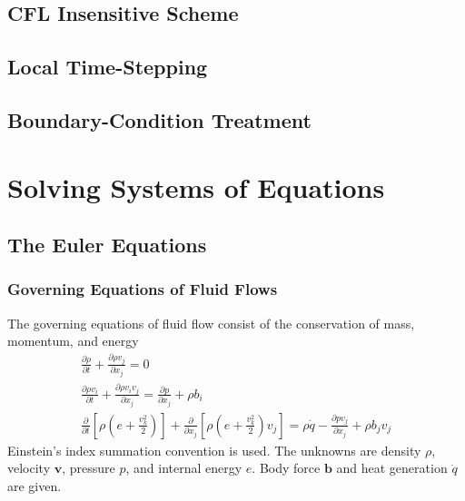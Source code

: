\documentclass{turgon}
\begin{document}
\section{CFL Insensitive Scheme}
\label{s:cese:ctau}

\section{Local Time-Stepping}
\label{s:cese:lts}

\section{Boundary-Condition Treatment}
\label{s:cese:bc}

\chapter{Solving Systems of Equations}
\label{c:syseq}

\section{The Euler Equations}
\label{s:syseq:euler}

\subsection{Governing Equations of Fluid Flows}

The governing equations of fluid flow consist of the conservation of mass,
momentum, and energy
%
\begin{gather}
  \frac{\partial\rho}{\partial t} + \frac{\partial\rho v_j}{\partial x_j}
  = 0
  \label{e:euler:mass}
  \\
  \frac{\partial\rho v_i}{\partial t}
  + \frac{\partial\rho v_iv_j}{\partial x_j}
  = \frac{\partial p}{\partial x_j} + \rho b_i
  \label{e:euler:momentum}
  \\
  \frac{\partial}{\partial t}
  \left[\rho\left( e + \frac{v_k^2}{2} \right)\right]
  + \frac{\partial}{\partial x_j}
  \left[\rho\left( e + \frac{v_k^2}{2} \right)v_j\right]
  = \rho \dot{q} - \frac{\partial pv_j}{\partial x_j} + \rho b_jv_j
  \label{e:euler:energy}
\end{gather}
%
Einstein's index summation convention is used.
The unknowns are density $\rho$, velocity $\mathbf{v}$, pressure $p$, and
internal energy $e$.
Body force $\mathbf{b}$ and heat generation $\dot{q}$ are given.
\end{document}
